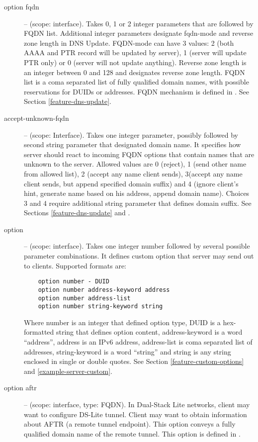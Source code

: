 \begin{description}
 \item[option fqdn] -- (scope: interface). Takes 0, 1 or 2 integer
   parameters that are followed by FQDN list. Additional integer
   parameters designate fqdn-mode and reverse zone length in DNS
   Update. FQDN-mode can have 3 values: 2 (both AAAA and PTR record
   will be updated by server), 1 (server will update PTR only) or 
   0 (server will not update anything). Reverse zone length is an
   integer between 0 and 128 and designates reverse zone length. FQDN
   list is a coma separated list of fully qualified domain names, with
   possible reservations for DUIDs or addresses. FQDN mechanism is
   defined in \cite{rfc4704}. See Section \ref{feature-dns-update}.
   
\item[accept-unknown-fqdn] -- (scope: Interface). Takes one integer
  parameter, possibly followed by second string parameter that
  designated domain name. It specifies how server should react to
  incoming FQDN options that contain names that are unknown to the
  server. Allowed values are 0 (reject), 1 (send other name from
  allowed list), 2 (accept any name client sends), 3(accept any name
  client sends, but append specified domain suffix) and 4 (ignore
  client's hint, generate name based on his address, append domain
  name). Choices 3 and 4 require additional string parameter that
  defines domain suffix. See Sections \ref{feature-dns-update}
  and \label{example-server-fqdn}.
 
\item[option] -- (scope: interface). Takes one integer number followed
  by several possible parameter combinations. It defines custom
  option that server may send out to clients. Supported formats are:
  \begin{lstlisting}
    option number - DUID
    option number address-keyword address
    option number address-list
    option number string-keyword string
  \end{lstlisting}
Where number is an integer that defined option type, DUID is a
hex-formatted string that defines option content, address-keyword is a
word ``address'', address is an IPv6 address, address-list is coma
separated list of addresses, string-keyword is a word ``string'' and
string is any string enclosed in single or double quotes. See Section
\ref{feature-custom-options} and \ref{example-server-custom}.

 \item[option aftr] -- (scope: interface, type: FQDN). In Dual-Stack Lite
   networks, client may want to configure DS-Lite tunnel. Client may
   want to obtain information about AFTR (a remote tunnel
   endpoint). This option conveys a fully qualified domain name of the
   remote tunnel. This option is defined in \cite{rfc6334}.


\end{description}
